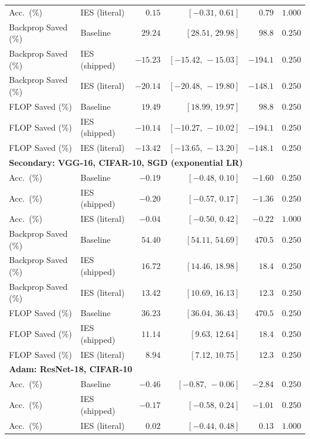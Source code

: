 \documentclass{article}
\newcommand{\win}[1]{\cellcolor{tgwin}#1}
\newcommand{\lose}[1]{\cellcolor{tglose}#1}
\theoremstyle{plain}
\theoremstyle{definition}
\theoremstyle{remark}
\begin{document}
\begin{longtable}{llrrrr}
Acc.\ (\%) & IES (literal) & \win{$0.15$} & $[-0.31,\,0.61]$ & $0.79$ & $1.000$ \\
Backprop Saved (\%) & Baseline & \win{$29.24$} & $[28.51,\,29.98]$ & $98.8$ & $0.250$ \\
Backprop Saved (\%) & IES (shipped) & \lose{$-15.23$} & $[-15.42,\,-15.03]$ & $-194.1$ & $0.250$ \\
Backprop Saved (\%) & IES (literal) & \lose{$-20.14$} & $[-20.48,\,-19.80]$ & $-148.1$ & $0.250$ \\
FLOP Saved (\%) & Baseline & \win{$19.49$} & $[18.99,\,19.97]$ & $98.8$ & $0.250$ \\
FLOP Saved (\%) & IES (shipped) & \lose{$-10.14$} & $[-10.27,\,-10.02]$ & $-194.1$ & $0.250$ \\
FLOP Saved (\%) & IES (literal) & \lose{$-13.42$} & $[-13.65,\,-13.20]$ & $-148.1$ & $0.250$ \\
\midrule
\multicolumn{6}{l}{\textbf{Secondary: VGG-16, CIFAR-10, SGD (exponential LR)}} \\
\midrule
Acc.\ (\%) & Baseline & \lose{$-0.19$} & $[-0.48,\,0.10]$ & $-1.60$ & $0.250$ \\
Acc.\ (\%) & IES (shipped) & \lose{$-0.20$} & $[-0.57,\,0.17]$ & $-1.36$ & $0.250$ \\
Acc.\ (\%) & IES (literal) & \lose{$-0.04$} & $[-0.50,\,0.42]$ & $-0.22$ & $1.000$ \\
Backprop Saved (\%) & Baseline & \win{$54.40$} & $[54.11,\,54.69]$ & $470.5$ & $0.250$ \\
Backprop Saved (\%) & IES (shipped) & \win{$16.72$} & $[14.46,\,18.98]$ & $18.4$ & $0.250$ \\
Backprop Saved (\%) & IES (literal) & \win{$13.42$} & $[10.69,\,16.13]$ & $12.3$ & $0.250$ \\
FLOP Saved (\%) & Baseline & \win{$36.23$} & $[36.04,\,36.43]$ & $470.5$ & $0.250$ \\
FLOP Saved (\%) & IES (shipped) & \win{$11.14$} & $[9.63,\,12.64]$ & $18.4$ & $0.250$ \\
FLOP Saved (\%) & IES (literal) & \win{$8.94$} & $[7.12,\,10.75]$ & $12.3$ & $0.250$ \\
\midrule
\multicolumn{6}{l}{\textbf{Adam: ResNet-18, CIFAR-10}} \\
\midrule
Acc.\ (\%) & Baseline & \lose{$-0.46$} & $[-0.87,\,-0.06]$ & $-2.84$ & $0.250$ \\
Acc.\ (\%) & IES (shipped) & \lose{$-0.17$} & $[-0.58,\,0.24]$ & $-1.01$ & $0.250$ \\
Acc.\ (\%) & IES (literal) & \win{$0.02$} & $[-0.44,\,0.48]$ & $0.13$ & $1.000$ \\

\end{longtable}
\end{document}
